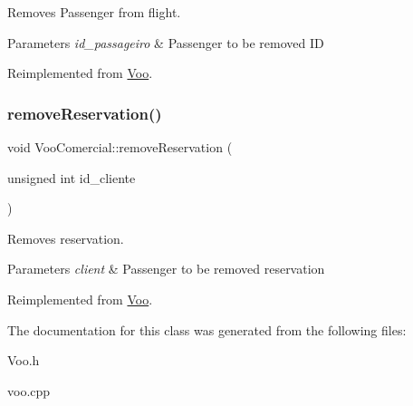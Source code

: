 Removes Passenger from flight. 


\begin{DoxyParams}{Parameters}
{\em id\+\_\+passageiro} & Passenger to be removed ID \\
\hline
\end{DoxyParams}


Reimplemented from \hyperlink{class_voo_ad0c67dc3c01f30746e150f26d5bf15ac}{Voo}.

\mbox{\label{class_voo_comercial_ab5aed9e0ee7812f186c62ac1f98d7671}} 
\subsubsection{\texorpdfstring{remove\+Reservation()}{removeReservation()}}
{\footnotesize\ttfamily void Voo\+Comercial\+::remove\+Reservation (\begin{DoxyParamCaption}\item[{unsigned int}]{id\+\_\+cliente }\end{DoxyParamCaption})\hspace{0.3cm}{\ttfamily [virtual]}}



Removes reservation. 


\begin{DoxyParams}{Parameters}
{\em client} & Passenger to be removed reservation \\
\hline
\end{DoxyParams}


Reimplemented from \hyperlink{class_voo_ab9b59a39248b92a5f106800117436d90}{Voo}.



The documentation for this class was generated from the following files\+:\begin{DoxyCompactItemize}
\item 
Voo.\+h\item 
voo.\+cpp\end{DoxyCompactItemize}
